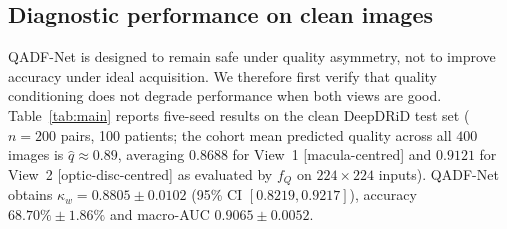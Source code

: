 \documentclass[final,5p,times,twocolumn,authoryear]{elsarticle}
\newcommand{\qadfnet}{QADF-Net}
\theoremstyle{plain}
\theoremstyle{remark}
\begin{document}
\subsection{Diagnostic performance on clean images}
\label{sec:r_clean}

\qadfnet{} is designed to remain safe under quality asymmetry, not to improve accuracy under ideal acquisition. We therefore first verify that quality conditioning does not degrade performance when both views are good. Table~\ref{tab:main} reports five-seed results on the clean DeepDRiD test set ($n=200$ pairs, 100 patients; the cohort mean predicted quality across all $400$ images is $\hat{q}\approx 0.89$, averaging $0.8688$ for View~1 [macula-centred] and $0.9121$ for View~2 [optic-disc-centred] as evaluated by $f_Q$ on $224\times224$ inputs). \qadfnet{} obtains $\kappa_w = 0.8805 \pm 0.0102$ (95\% CI $[0.8219, 0.9217]$), accuracy $68.70\% \pm 1.86\%$ and macro-AUC $0.9065 \pm 0.0052$.
\end{document}
